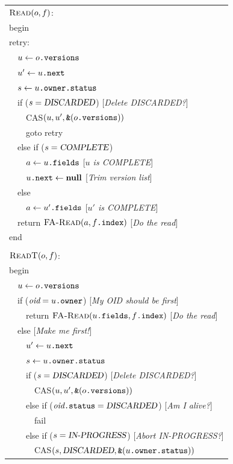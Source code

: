 \begin{figure}
\sis\small%
\renewcommand{\>}{~~}%
\newcommand{\com}[1]{\hfill [{\sl #1}]}%
\begin{tabular}{l}%
$\text{\sc Read}(o, f)$:\\
begin\\
retry:\\
\>$u \gets o\text{\tt .versions}$ \\
\>$u' \gets u\text{\tt .next}$ \\
\>$s  \gets u\text{\tt .owner}\text{\tt .status}$ \\
\>if ($s=\text{\sl DISCARDED}$) \com{Delete DISCARDED?}\\
\>\>CAS$(u, u', \text{\tt \&}(o\text{\tt .versions}))$\\
\>\>goto retry \\
\>else if ($s=\text{\sl COMPLETE}$)\\
\>\>$a \gets u\text{\tt .fields}$ \com{$u$ is COMPLETE}\\
\>\>$u\text{\tt .next} \gets \text{\bf null}$ \com{Trim version list}\\
\>else\\
\>\>$a \gets u'\text{\tt .fields}$ \com{$u'$ is COMPLETE}\\
\>return $\text{\sc FA-Read}(a, f\text{\tt .index})$ \com{Do the read}\\
end\\
\\
$\text{\sc ReadT}(o, f)$:\\
begin\\
\>$u \gets o\text{\tt .versions}$\\
\>if ($\text{\it oid} = u\text{\tt .owner}$) \com{My OID should be first}\\
\>\>return $\text{\sc FA-Read}(u\text{\tt .fields}, f\text{\tt .index})$
\com{Do the read}\\
\>else \com{Make me first!}\\
\>\>$u' \gets u\text{\tt .next}$\\
\>\>$s  \gets u\text{\tt .owner}\text{\tt .status}$\\
\>\>if ($s=\text{\sl DISCARDED}$) \com{Delete DISCARDED?}\\
\>\>\>CAS$(u, u', \text{\tt \&}(o\text{\tt .versions}))$\\
\>\>else if ($\text{\it oid}\text{\tt .status}=\text{\sl DISCARDED}$)
\com{Am I alive?}\\
\>\>\>fail\\
\>\>else if ($s=\text{\sl IN-PROGRESS}$) \com{Abort IN-PROGRESS?}\\
\>\>\>CAS$(s, \text{\sl DISCARDED}, \text{\tt \&}(u\text{\tt .owner}\text{\tt .status}))$\\

\end{tabular}
\end{figure}
